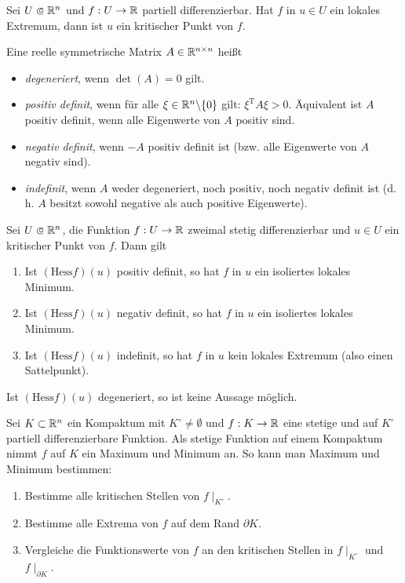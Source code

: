 \documentclass{cheat-sheet}
\newcommand\opn{\mathrel{\ooalign{$\subset$\cr
  \hidewidth\raise.1ex\hbox{$\circ\mkern.5mu$}\cr}}}
\begin{document}
\begin{satz}
Sei $U \opn \R^n$ und $f : U \to \mathbb{R}$ partiell differenzierbar. Hat $f$ in $u \in U$ ein lokales Extremum, dann ist $u$ ein kritischer Punkt von $f$.
\end{satz}

\begin{defn}
Eine reelle symmetrische Matrix $A \in \mathbb{R}^{n \times n}$ heißt
\begin{itemize}
  \item \emph{degeneriert}, wenn $\det(A) = 0$ gilt.
  \item \emph{positiv definit}, wenn für alle $\xi \in \mathbb{R}^n \backslash \{ 0 \}$ gilt: $\xi^{\text{T}}A\xi > 0.$ Äquivalent ist $A$ positiv definit, wenn alle Eigenwerte von $A$ positiv sind.
  \item \emph{negativ definit}, wenn $-A$ positiv definit ist (bzw. alle Eigenwerte von $A$ negativ sind).
  \item \emph{indefinit}, wenn $A$ weder degeneriert, noch positiv, noch negativ definit ist (d.\,h. $A$ besitzt sowohl negative als auch positive Eigenwerte).
\end{itemize}
\end{defn}

\begin{satz}
Sei $U \opn \R^n$, die Funktion $f : U \to \mathbb{R}$ zweimal stetig differenzierbar und $u \in U$ ein kritischer Punkt von $f$. Dann gilt
\begin{enumerate}
  \item Ist $(\mathrm{Hess} f)(u)$ positiv definit, so hat $f$ in $u$ ein isoliertes lokales Minimum.
  \item Ist $(\mathrm{Hess} f)(u)$ negativ definit, so hat $f$ in $u$ ein isoliertes lokales Minimum.
  \item Ist $(\mathrm{Hess} f)(u)$ indefinit, so hat $f$ in $u$ kein lokales Extremum (also einen Sattelpunkt).
\end{enumerate}
\end{satz}

\begin{acht}
Ist $(\mathrm{Hess} f)(u)$ degeneriert, so ist keine Aussage möglich.
\end{acht}

\begin{strat}
Sei $K \subset \mathbb{R}^n$ ein Kompaktum mit $K^{\circ} \not= \emptyset$ und $f : K \to \mathbb{R}$ eine stetige und auf $K^{\circ}$ partiell differenzierbare Funktion. Als stetige Funktion auf einem Kompaktum nimmt $f$ auf $K$ ein Maximum und Minimum an. So kann man Maximum und Minimum bestimmen:
\begin{enumerate}
  \item Bestimme alle kritischen Stellen von $f\mid_{K^{\circ}}$.
  \item Bestimme alle Extrema von $f$ auf dem Rand $\partial K$.
  \item Vergleiche die Funktionswerte von $f$ an den kritischen Stellen in $f\mid_{K^{\circ}}$ und $f\mid_{\partial K}$.
\end{enumerate}
\end{strat}
\end{document}
